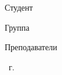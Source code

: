\begin{titlepage}
\begin{center}
        \fontsize{14pt}{14pt}\selectfont


        \begin{flushleft}
            {Студент \uline{\myname \hfill}}

            \vspace{0.5cm}

            {Группа \uline{\mygroup \hfill}}

            \vspace{0.5cm}



            {Преподаватели \uline{\teachers \hfill}}



            \vspace{0.5cm}

        \end{flushleft}

        \vfill

        \the\year\ г.

    \end{center}
\end{titlepage}

